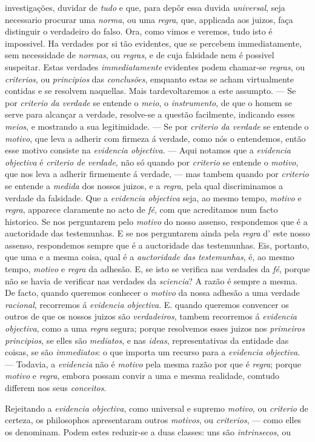 investigações, duvidar de \emph{tudo} e que, para depôr essa duvida \emph{universal}, seja necessario procurar uma \emph{norma}, ou uma \emph{regra}, que, applicada aos juizos, faça distinguir o verdadeiro do falso. Ora, como vimos e veremos, tudo isto é impossivel. Ha verdades por si tão evidentes, que se percebem immediatamente, sem necessidade de \emph{normas}, ou \emph{regras}, e de cuja falsidade nem é possivel suspeitar. Estas verdades \emph{immediatamente} evidentes podem chamar-se \emph{regras}, ou \emph{criterios}, ou \emph{principios} das \emph{conclusões}, emquanto estas se acham virtualmente contidas e se resolvem naquellas. Mais tardevoltaremos a este assumpto. --- Se por \emph{criterio da verdade} se entende o \emph{meio}, o \emph{instrumento}, de que o homem se serve para alcançar a verdade, resolve-se a questão facilmente, indicando esses \emph{meios}, e mostrando a sua legitimidade. --- Se por \emph{criterio da verdade} se entende o \emph{motivo}, que leva a adherir com firmeza á verdade, como nós o entendemos, então esse motivo consiste na \emph{evidencia objectiva}. --- Aqui notamos que a \emph{evidencia objectiva} é \emph{criterio de verdade}, não só quando por \emph{criterio} se entende o \emph{motivo}, que nos leva a adherir firmemente á verdade, --- mas tambem quando por \emph{criterio} se entende a \emph{medida} dos nossos juizos, e a \emph{regra}, pela qual discriminamos a verdade da falsidade. Que a \emph{evidencia objectiva} seja, ao mesmo tempo, \emph{motivo} e \emph{regra}, apparece claramente no acto de \emph{fé}, com que acreditamos num facto historico. Se nos perguntarem pelo \emph{motivo} do nosso assenso, respondemos que é a auctoridade das testemunhas. E se nos perguntarem ainda pela \emph{regra} d' este nosso assenso, respondemos sempre que é a auctoridade das testemunhas. Eis, portanto, que uma e a mesma coisa, qual é a \emph{auctoridade das testemunhas}, é, ao mesmo tempo, \emph{motivo} e \emph{regra} da adhesão. E, se isto se verifica nas verdades da \emph{fé}, porque não se havia de verificar nas verdades da \emph{sciencia}? A razão é sempre a mesma. De facto, quando queremos conhecer o \emph{motivo} da nossa adhesão a uma verdade \emph{racional}, recorremos á \emph{evidencia objectiva}. E. quando queremos convencer os outros de que os nossos juizos são \emph{verdadeiros}, tambem recorremos á \emph{evidencia objectiva}, como a uma \emph{regra} segura; porque resolvemos esses juizos nos \emph{primeiros principios}, se elles são \emph{mediatos}, e nas \emph{ideas}, representativas da entidade das coisas, se são \emph{immediatos}: o que importa um recurso para a \emph{evidencia objectiva}. --- Todavia, a \emph{evidencia} não é \emph{motivo} pela mesma razão por que é \emph{regra}; porque \emph{motivo} e \emph{regra}, embora possam convir a uma e mesma realidade, comtudo differem nos seus \emph{conceitos}.\par *\par Rejeitando a \emph{evidencia objectiva}, como universal e supremo \emph{motivo}, ou \emph{criterio} de certeza, os philosophos apresentaram outros \emph{motivos}, ou \emph{criterios}, --- como elles os denominam. Podem estes reduzir-se a duas classes: uns são \emph{intrinsecos}, ou 